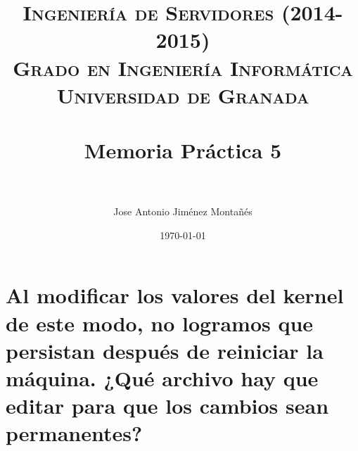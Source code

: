 

\usepackage[pdftex,colorlinks=true,linkcolor=negro,urlcolor=blue]{hyperref,xcolor}

\graphicspath{ {./imagenes/} }
\usepackage{subfig}
\hypersetup{citecolor=blue}

\title{	
\normalfont \normalsize 
\textsc{{\bf Ingeniería de Servidores (2014-2015)} \\ Grado en Ingeniería Informática \\ Universidad de Granada} \\ [25pt]
\horrule{0.5pt} \\[0.4cm] %
\huge Memoria Práctica 5 \\ %
\horrule{2pt} \\[0.5cm] %
}

\author{Jose Antonio Jiménez Montañés}

\date{\normalsize\today}

%






\maketitle %

\newpage %

\tableofcontents %
\clearpage
\listoffigures


\newpage

\section{Al modificar los valores del kernel de este modo, no logramos que persistan después de reiniciar la máquina. ¿Qué archivo hay que editar para que los cambios sean permanentes?}

